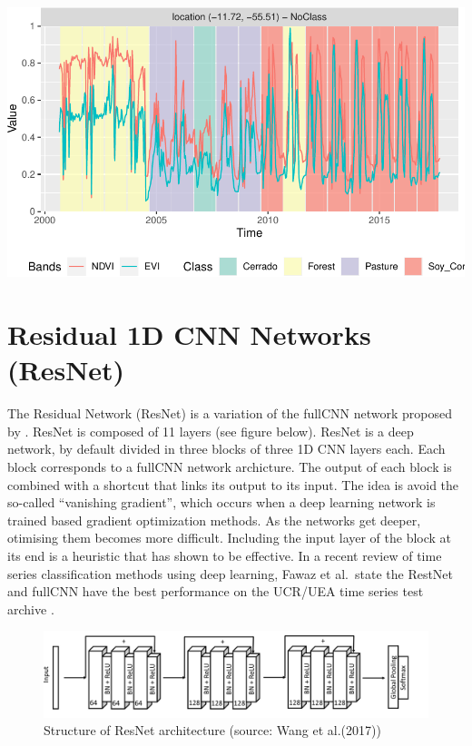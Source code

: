 \documentclass[a4paper,]{tufte-book}
\begin{document}
\begin{center}\includegraphics[width=0.7\linewidth]{sitsbook_files/figure-latex/unnamed-chunk-54-1} \end{center}

\hypertarget{residual-1d-cnn-networks-resnet}{%
\section{Residual 1D CNN Networks (ResNet)}\label{residual-1d-cnn-networks-resnet}}

The Residual Network (ResNet) is a variation of the fullCNN network proposed by \citet{Wang2017}. ResNet is composed of 11 layers (see figure below). ResNet is a deep network, by default divided in three blocks of three 1D CNN layers each. Each block corresponds to a fullCNN network archicture. The output of each block is combined with a shortcut that links its output to its input. The idea is avoid the so-called ``vanishing gradient'', which occurs when a deep learning network is trained based gradient optimization methods\citep{Hochreiter1998}. As the networks get deeper, otimising them becomes more difficult. Including the input layer of the block at its end is a heuristic that has shown to be effective. In a recent review of time series classification methods using deep learning, Fawaz et al.~state the RestNet and fullCNN have the best performance on the UCR/UEA time series test archive \citep{Fawaz2019}.

\begin{figure}

{\centering \includegraphics[width=0.8\linewidth,height=0.8\textheight]{images/resnet} 

}

\caption[Structure of ResNet architecture (source]{Structure of ResNet architecture (source: Wang et al.(2017))}\label{fig:unnamed-chunk-55}
\end{figure}
\end{document}
